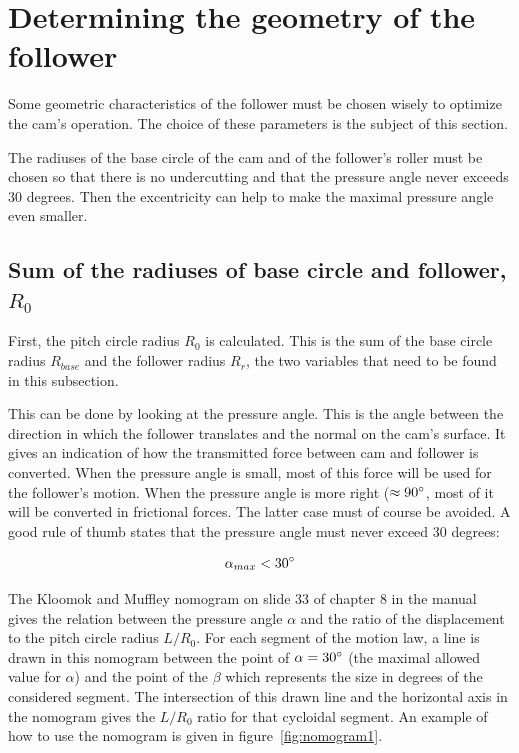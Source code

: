 \documentclass[a4paper]{article}
\begin{document}
\section{Determining the geometry of the follower}
\label{sec:2}

Some geometric characteristics of the follower must be chosen wisely to optimize the cam's operation. The choice of these parameters is the subject of this section.

The radiuses of the base circle of the cam and of the follower's roller must be chosen so that there is no undercutting and that the pressure angle never exceeds 30 degrees. Then the excentricity can help to make the maximal pressure angle even smaller.

\subsection{Sum of the radiuses of base circle and follower, \(R_0\)}

First, the pitch circle radius \(R_0\) is calculated. This is the sum of the base circle radius \(R_{base}\) and the follower radius \(R_r\), the two variables that need to be found in this subsection. 

This can be done by looking at the pressure angle. This is the angle between the direction in which the follower translates and the normal on the cam's surface. It gives an indication of how the transmitted force between cam and follower is converted. When the pressure angle is small, most of this force will be used for the follower's motion. When the pressure angle is more right (\(\approx90\degree\), most of it will be converted in frictional forces. The latter case must of course be avoided. A good rule of thumb states that the pressure angle must never exceed 30 degrees:

\begin{equation}
	\alpha_{max} < 30 \degree 
\end{equation}

The Kloomok and Muffley nomogram on slide 33 of chapter 8 in the manual~\cite{cursus} gives the relation between the pressure angle \(\alpha\) and the ratio of the displacement to the pitch circle radius \(L/R_0\). For each segment of the motion law, a line is drawn in this nomogram between the point of \(\alpha=30 \degree\) (the maximal allowed value for \(\alpha\)) and the point of the \(\beta\) which represents the size in degrees of the considered segment. The intersection of this drawn line and the horizontal axis in the nomogram gives the \(L/R_0\) ratio for that cycloidal segment. An example of how to use the nomogram is given in figure~\ref{fig:nomogram1}.
\end{document}

